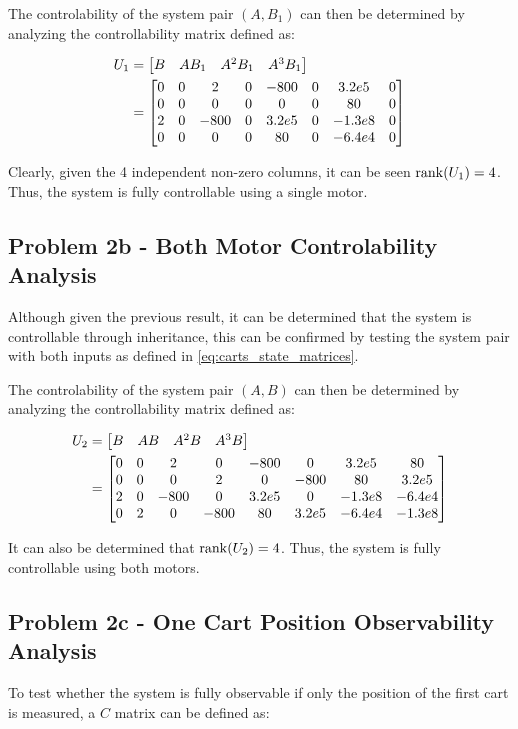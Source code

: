 \documentclass[]{article}
\begin{document}
		The controlability of the system pair $(A, B_1)$ can then be determined by analyzing the controllability matrix defined as:
		
		\begin{equation}
			\begin{aligned}
				U_1 &= \mqty[B		&A B_1		&A^2 B_1	&A^3 B_1]\\
					&= \mqty[0	&0	&2		&0	&-800	&0	&3.2e5	&0\\
							 0	&0	&0		&0	&0		&0	&80		&0\\
							 2	&0	&-800	&0	&3.2e5	&0	&-1.3e8	&0\\
							 0	&0	&0		&0	&80		&0	&-6.4e4	&0]
			\end{aligned}
		\end{equation}
		
		Clearly, given the 4 independent non-zero columns, it can be seen $\rank(U_1) = 4$. Thus, the system is fully controllable using a single motor.
		
	\subsection{Problem 2b - Both Motor Controlability Analysis}
		Although given the previous result, it can be determined that the system is controllable through inheritance, this can be confirmed by testing the system pair with both inputs as defined in \eqref{eq:carts_state_matrices}.
		
		The controlability of the system pair $(A, B)$ can then be determined by analyzing the controllability matrix defined as:
		
		\begin{equation}
			\begin{aligned}
				U_2 &= \mqty[B		&AB				&A^2B			&A^3B]\\
					&= \mqty[0	&0	&2		&0		&-800	&0		&3.2e5	&80\\
							 0	&0	&0		&2		&0		&-800	&80		&3.2e5\\
						 	 2	&0	&-800	&0	 	&3.2e5	&0		&-1.3e8	&-6.4e4\\
							 0	&2	&0		&-800	&80		&3.2e5	&-6.4e4	&-1.3e8]
			\end{aligned}
		\end{equation}
		
		It can also be determined that $\rank(U_2) = 4$. Thus, the system is fully controllable using both motors.
	
	\newpage
	\subsection{Problem 2c - One Cart Position Observability Analysis}
		To test whether the system is fully observable if only the position of the first cart is measured, a $C$ matrix can be defined as:
		
\end{document}
